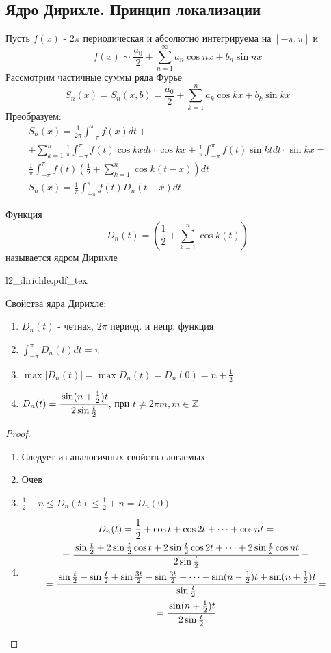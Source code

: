 \documentclass{article}
\newcommand{\incfig}[2][1]{%
    \def\svgwidth{#1\columnwidth}
    \hbox{{#2.pdf_tex}}
}
\theoremstyle{definition}
\numberwithin{theorem}{section}
\numberwithin{lemma}{section}
\numberwithin{definition}{section}
\numberwithin{corollary}{section}
\numberwithin{equation}{section}
\begin{document}
\subsection{Ядро Дирихле. Принцип локализации}
Пусть $f(x)$ - $2\pi$ периодическая и абсолютно интегрируема на $[-\pi,\pi]$ и
\[
  f(x) \sim \frac{a_0}{2}+\sum_{n=1}^{\infty}a_n \cos nx + b_n \sin nx
\]
Рассмотрим частичные суммы ряда Фурье
\[
  S_n(x)=S_n(x,b)=\frac{a_0}{2}+\sum_{k=1}^{n}a_k \cos kx + b_k \sin kx
\]
Преобразуем:
\begin{gather*}
  S_n(x)= \frac{1}{2\pi}\int_{-\pi}^{\pi}f(x)dt+ \\ 
  +\sum_{k=1}^{n}\frac{1}{\pi}\int_{-\pi}^{\pi}f(t)\cos kx dt \cdot \cos kx +
  \frac{1}{\pi}\int_{-\pi}^{\pi}f(t)\sin kt dt \cdot \sin kx =\\
  \frac{1}{\pi}\int_{-\pi}^{\pi}f(t)
  \left(\frac{1}{2}+\sum_{k=1}^{n}\cos k(t-x)\right)dt \\ 
  S_n(x)=\frac{1}{\pi}\int_{-\pi}^{\pi}f(t)D_n(t-x)dt
\end{gather*}
\begin{definition}
  Функция 
  \[
    D_n(t)=\left(\frac{1}{2}+\sum_{k=1}^{n}\cos k(t)\right)
  \]
  называется ядром Дирихле
\end{definition}
\incfig{l2_dirichle}
Свойства ядра Дирихле:
\begin{enumerate}
  \item $D_n(t)$ - четная, $2\pi$ период. и непр. функция
  \item $\int_{-\pi}^{\pi}D_n(t)dt=\pi$
  \item $\max|D_n(t)|=\max D_n(t)=D_n(0)=n+\frac{1}{2}$
  \item $D_n(t)=\cfrac{\sin (n+\frac{1}{2})t}{2\sin \frac{t}{2}}$, при $t\neq 2\pi m, m\in \mathbb{Z}$
\end{enumerate}
\begin{proof} \phantom{.} 

  \begin{enumerate}
    \item Следует из аналогичных свойств слогаемых
    \item Очев
    \item $\frac{1}{2}-n\le D_n(t) \le \frac{1}{2}+n = D_n(0)$
    \item
      \begin{gather*}
        D_n(t)=\frac{1}{2}+\cos t + \cos 2t + \dots + \cos nt = \\ 
        = \cfrac{\sin \frac{t}{2}+2\sin\frac{t}{2}\cos t + 2\sin\frac{t}{2}\cos 2t + \dots + 2\sin \frac{t}{2}\cos nt}{2\sin\frac{t}{2}}= \\
        =\cfrac{\sin \frac{t}{2}-\sin \frac{t}{2}+\sin \frac{3t}{2} - \sin \frac{3t}{2} + \dots - \sin (n-\frac{1}{2})t + \sin (n+\frac{1}{2})t}{\sin\frac{t}{2}}= \\ 
        =\cfrac{\sin (n+\frac{1}{2})t}{2\sin\frac{t}{2}} 
      \end{gather*}
  \end{enumerate}
\end{proof}
\end{document}
